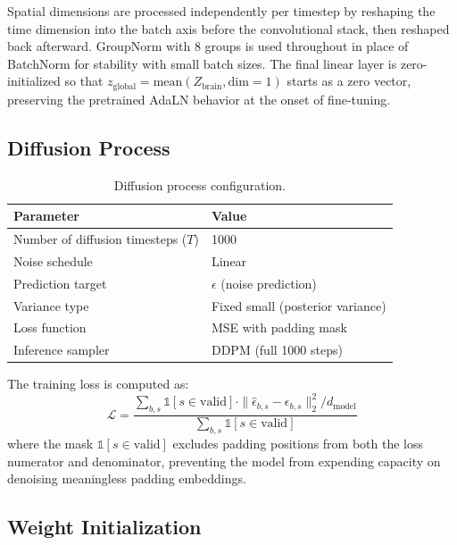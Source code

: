 \documentclass{article}
\begin{document}
\noindent Spatial dimensions are processed independently per timestep by reshaping the time dimension into the batch axis before the convolutional stack, then reshaped back afterward. GroupNorm with 8 groups is used throughout in place of BatchNorm for stability with small batch sizes. The final linear layer is zero-initialized so that $z_{\text{global}} = \mathrm{mean}(Z_{\text{brain}}, \mathrm{dim}=1)$ starts as a zero vector, preserving the pretrained AdaLN behavior at the onset of fine-tuning.
 
\subsection{Diffusion Process}
 
\begin{table}[h]
\centering
\caption{Diffusion process configuration.}
\label{tab:diffusion}
\begin{tabular}{ll}
\toprule
\textbf{Parameter} & \textbf{Value} \\
\midrule
Number of diffusion timesteps ($T$) & 1000 \\
Noise schedule & Linear \\
Prediction target & $\epsilon$ (noise prediction) \\
Variance type & Fixed small (posterior variance) \\
Loss function & MSE with padding mask \\
Inference sampler & DDPM (full 1000 steps) \\
\bottomrule
\end{tabular}
\end{table}
 
\noindent The training loss is computed as:
\begin{equation}
    \mathcal{L} = \frac{\sum_{b,s} \mathbb{1}[s \in \text{valid}] \cdot \| \hat{\epsilon}_{b,s} - \epsilon_{b,s} \|^2_2 / d_{\text{model}}}{\sum_{b,s} \mathbb{1}[s \in \text{valid}]}
\end{equation}
where the mask $\mathbb{1}[s \in \text{valid}]$ excludes padding positions from both the loss numerator and denominator, preventing the model from expending capacity on denoising meaningless padding embeddings.
 
\subsection{Weight Initialization}
 
\end{document}
